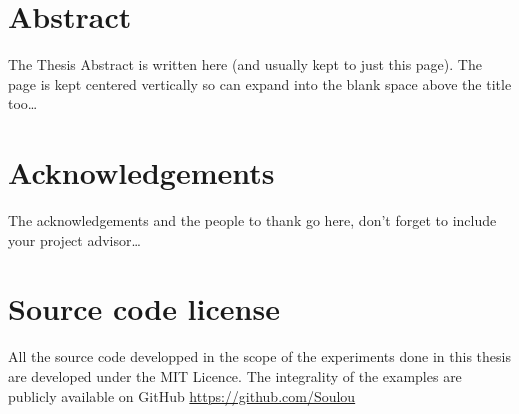 \documentclass[a4paper, 12pt, oneside]{Thesis}  %
\begin{document}




\chapter{Abstract}

The Thesis Abstract is written here (and usually kept to just this page). The page is kept centered vertically so can expand into the blank space above the title too\ldots


\clearpage  %


\chapter{Acknowledgements}

The acknowledgements and the people to thank go here, don't forget to include
your project advisor\ldots

\clearpage  %
\chapter{Source code license}

All the source code developped in the scope of the experiments done in this
thesis are developed under the MIT Licence. The integrality of the examples
are publicly available on GitHub \url{https://github.com/Soulou}
\end{document}
